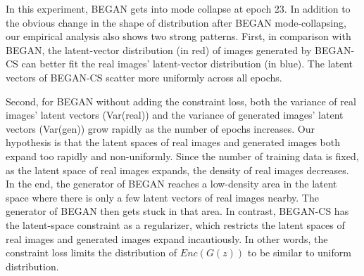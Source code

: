 \documentclass[runningheads]{llncs}
\begin{document}
    In this experiment, BEGAN gets into mode collapse at epoch 23. In addition to the obvious change in the shape of distribution after BEGAN mode-collapsing, our empirical analysis also shows two strong patterns. First, in comparison with BEGAN, the latent-vector distribution (in red) of images generated by BEGAN-CS can better fit the real images' latent-vector distribution (in blue). The latent vectors of BEGAN-CS scatter more uniformly across all epochs. 
    
    Second, for BEGAN without adding the constraint loss, both the variance of real images' latent vectors (Var(real)) and the variance of generated images' latent vectors (Var(gen)) grow rapidly as the number of epochs increases. Our hypothesis is that the latent spaces of real images and generated images  both expand too rapidly and non-uniformly. Since the number of training data is fixed, as the latent space of real images expands, the density of real images decreases. In the end, the generator of BEGAN reaches a low-density area in the latent space where there is only a few latent vectors of real images nearby. The generator of BEGAN then gets stuck in that area. In contrast, BEGAN-CS has the latent-space constraint as a regularizer, which restricts the latent spaces of real images and generated images expand incautiously. In other words, the constraint loss limits the distribution of $Enc(G(z))$ to be similar to uniform distribution.
    
\end{document}
